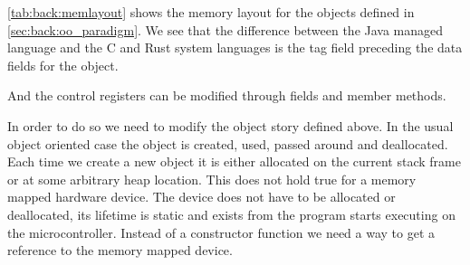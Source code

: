 \autoref{tab:back:memlayout} shows the memory layout for the objects defined in \autoref{sec:back:oo_paradigm}.
We see that the difference between the Java managed language and the C and Rust system languages is the tag field preceding the data fields for the object.
\begin{table}[H]

  \centering
  \hfill
  \hfill
  \caption{Memory layout of objects}
  \label{tab:back:memlayout}

\end{table}

And the control registers can be modified through fields and member methods.

In order to do so we need to modify the object story defined above.
In the usual object oriented case the object is created, used, passed around and deallocated.
Each time we create a new object it is either allocated on the current stack frame or at some arbitrary heap location.
This does not hold true for a memory mapped hardware device.
The device does not have to be allocated or deallocated, its lifetime is static and exists from the program starts executing on the microcontroller.
Instead of a constructor function we need a way to get a reference to the memory mapped device.
